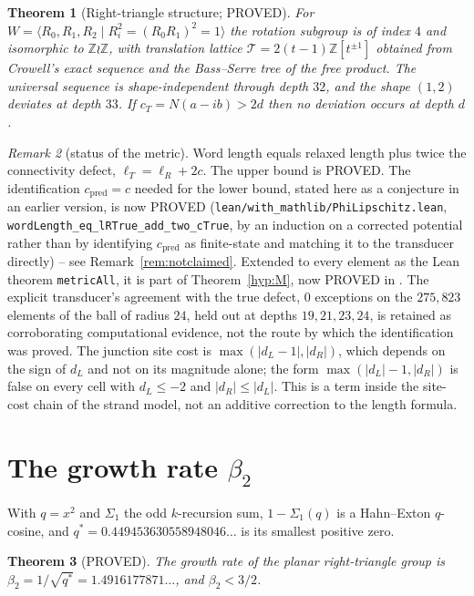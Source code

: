 \documentclass[11pt]{article}
\newtheorem{theorem}{Theorem}[section]
\theoremstyle{definition}
\theoremstyle{remark}
\newtheorem{remark}[theorem]{Remark}
\theoremstyle{definition}
\newcommand{\Z}{\mathbb{Z}}
\begin{document}
\begin{theorem}[Right-triangle structure; PROVED]\label{thm:right}
For $W=\langle R_0,R_1,R_2\mid R_i^2=(R_0R_1)^2=1\rangle$ the rotation subgroup is of index $4$
and isomorphic to $\Z\wr\Z$, with translation lattice $\mathcal T=2(t-1)\Z[t^{\pm1}]$ obtained
from Crowell's exact sequence and the Bass--Serre tree of the free product. The universal
sequence is shape-independent through depth $32$, and the shape $(1,2)$ deviates at depth $33$.
If $c_T=N(a-ib)>2d$ then no deviation occurs at depth $d$.
\end{theorem}

\begin{remark}[status of the metric]\label{rem:metric}
Word length equals relaxed length plus twice the connectivity defect, $\ell_T=\ell_R+2c$. The
upper bound is PROVED. The identification $c_{\mathrm{pred}}=c$ needed for the lower bound,
stated here as a conjecture in an earlier version, is now PROVED
(\texttt{lean/with\_mathlib/PhiLipschitz.lean}, \texttt{wordLength\_eq\_lRTrue\_add\_two\_cTrue},
by an induction on a corrected potential rather than by identifying $c_{\mathrm{pred}}$ as
finite-state and matching it to the transducer directly) -- see Remark~\ref{rem:notclaimed}. Extended to every element as the Lean theorem \texttt{metricAll}, it is part of
Theorem~\ref{hyp:M}, now PROVED in \cite{paper2}. The explicit transducer's agreement with the true defect, $0$ exceptions on the
$275{,}823$ elements of the ball of radius $24$, held out at depths $19,21,23,24$, is retained as
corroborating computational evidence, not the route by which the identification was proved. The
junction site cost is
$\max(|d_L-1|,|d_R|)$, which depends on the sign of $d_L$ and not on its magnitude alone; the
form $\max(|d_L|-1,|d_R|)$ is false on every cell with $d_L\le-2$ and $|d_R|\le|d_L|$. This is a
term inside the site-cost chain of the strand model, not an additive correction to the length
formula.
\end{remark}

\section{The growth rate $\beta_2$}\label{sec:beta}

With $q=x^2$ and $\Sigma_1$ the odd $k$-recursion sum, $1-\Sigma_1(q)$ is a Hahn--Exton
$q$-cosine, and $q^\ast=0.449453630558948046\ldots$ is its smallest positive zero.

\begin{theorem}[PROVED]\label{thm:beta}
The growth rate of the planar right-triangle group is
$\beta_2=1/\sqrt{q^\ast}=1.4916177871\ldots$, and $\beta_2<3/2$.
\end{theorem}
\end{document}
